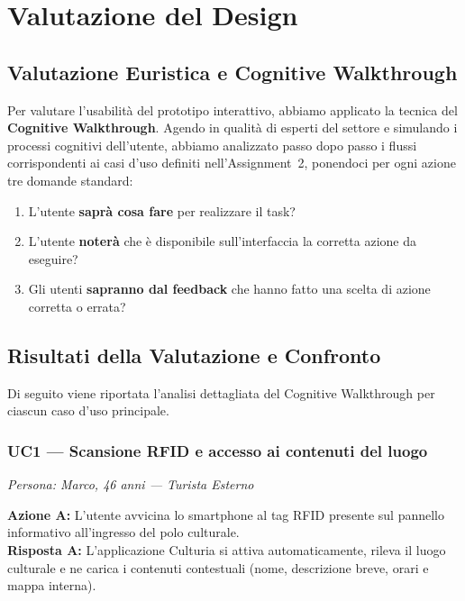 \section{Valutazione del Design}

\subsection{Valutazione Euristica e Cognitive Walkthrough}

Per valutare l'usabilità del prototipo interattivo, abbiamo applicato la tecnica del \textbf{Cognitive Walkthrough}. Agendo in qualità di esperti del settore e simulando i processi cognitivi dell'utente, abbiamo analizzato passo dopo passo i flussi corrispondenti ai casi d'uso definiti nell'Assignment~2, ponendoci per ogni azione tre domande standard:

\begin{enumerate}[nosep, leftmargin=1.6em]
    \item L'utente \textbf{saprà cosa fare} per realizzare il task?
    \item L'utente \textbf{noterà} che è disponibile sull'interfaccia la corretta azione da eseguire?
    \item Gli utenti \textbf{sapranno dal feedback} che hanno fatto una scelta di azione corretta o errata?
\end{enumerate}

\subsection{Risultati della Valutazione e Confronto}

Di seguito viene riportata l'analisi dettagliata del Cognitive Walkthrough per ciascun caso d'uso principale.

\subsubsection{UC1 --- Scansione RFID e accesso ai contenuti del luogo}
\textit{Persona: Marco, 46 anni --- Turista Esterno}

\vspace{0.3cm}

\noindent\textbf{Azione A:} L'utente avvicina lo smartphone al tag RFID presente sul pannello informativo all'ingresso del polo culturale.\\
\textbf{Risposta A:} L'applicazione Culturia si attiva automaticamente, rileva il luogo culturale e ne carica i contenuti contestuali (nome, descrizione breve, orari e mappa interna).

